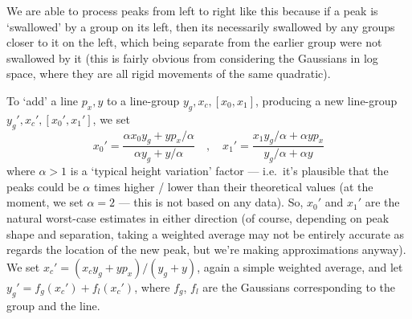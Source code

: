 We are able to process peaks from left to right like this because if
a peak is `swallowed' by a group on its left, then its necessarily
swallowed by any groups closer to it on the left, which being separate
from the earlier group were not swallowed by it (this is fairly obvious
from considering the Gaussians in log space, where they are all rigid
movements of the same quadratic).


To `add' a line $p_x, y$ to a line-group $y_g, x_c, [x_0, x_1]$, producing
a new line-group $y_g', x_c', [x_0', x_1']$, we set
\[
x_0' = \frac{\alpha x_0 y_g + y p_x / \alpha}{\alpha y_g + y/\alpha}
\quad , \quad
x_1' = \frac{x_1 y_g/\alpha + \alpha y p_x}{y_g/\alpha +\alpha y}
\]
where $\alpha > 1$ is a `typical height variation' factor --- i.e.\ it's
plausible that the peaks could be $\alpha$ times higher / lower than
their theoretical values (at the moment, we set $\alpha = 2$ --- this is
not based on any data). So, $x_0'$ and $x_1'$ are the natural worst-case
estimates in either direction (of course, depending on peak shape and separation,
taking a weighted average may not be entirely accurate as regards the location
of the new peak, but we're making approximations anyway).
We set $x_c' = (x_c y_g + y p_x)/(y_g + y)$, again a simple weighted average,
and let $y_g' = f_g (x_c') + f_l (x_c')$, where $f_g$, $f_l$ are the Gaussians
corresponding to the group and the line.


